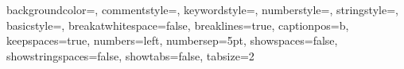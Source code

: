 

 {
  backgroundcolor=\color{bgCodeColor},
  commentstyle=\color{commentsColor},
  keywordstyle=\color{kwColor},
  numberstyle=\tiny\color{numColor},
  stringstyle=\color{stringColor},
  basicstyle=\ttfamily\footnotesize,
  breakatwhitespace=false,         
  breaklines=true,                 
  captionpos=b,                    
  keepspaces=true,                 
  numbers=left,                    
  numbersep=5pt,                  
  showspaces=false,                
  showstringspaces=false,
  showtabs=false,                  
  tabsize=2
}

\lstset{style=codeSnippet}

\newcommand\BackImage[2][scale=1]{%
\BgThispage
\backgroundsetup{
  contents={\texttt{[image: \#2]}}
  }
}




